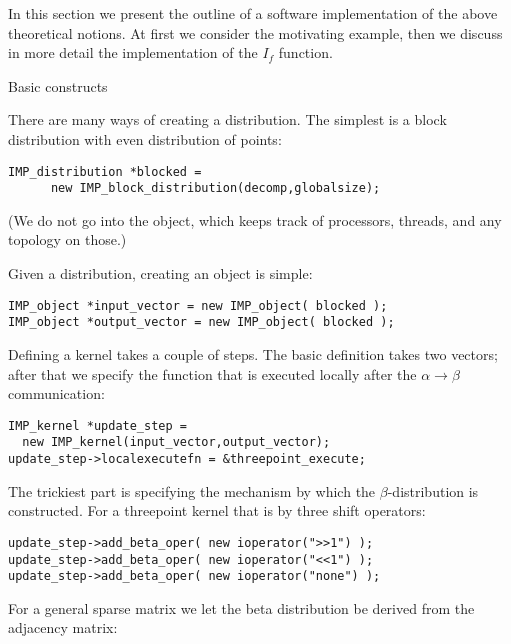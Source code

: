 In this section we present the outline of a software implementation
of the above theoretical notions. At first we consider the
motivating example, then we discuss in more detail the
implementation of the $I_f$ function.

 {Basic constructs}

There are many ways of creating a distribution. The simplest
is a block distribution with even distribution of points:
\begin{verbatim}
IMP_distribution *blocked = 
      new IMP_block_distribution(decomp,globalsize);
\end{verbatim}
(We do not go into the  object, which keeps track of
processors, threads, and any topology on those.)

Given a distribution, creating an object is simple:
\begin{verbatim}
IMP_object *input_vector = new IMP_object( blocked );
IMP_object *output_vector = new IMP_object( blocked );
\end{verbatim}

Defining a kernel takes a couple of steps. The basic
definition takes two vectors; after that we specify the function
that is executed locally after the $\alpha\rightarrow\beta$ communication:
\begin{verbatim}
IMP_kernel *update_step = 
  new IMP_kernel(input_vector,output_vector);
update_step->localexecutefn = &threepoint_execute;
\end{verbatim}

The trickiest part is specifying the mechanism by which the $\beta$-distribution
is constructed. For a threepoint kernel that is by three shift operators:
\begin{verbatim}
update_step->add_beta_oper( new ioperator(">>1") );
update_step->add_beta_oper( new ioperator("<<1") );
update_step->add_beta_oper( new ioperator("none") );
\end{verbatim}

For a general sparse matrix we let the beta distribution be derived
from the adjacency matrix:

